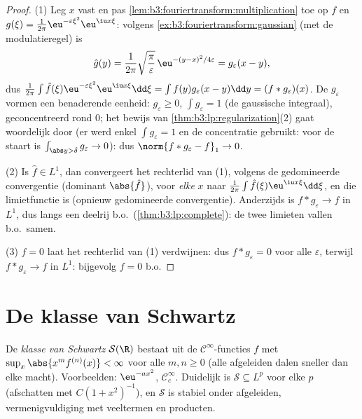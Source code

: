 \begin{proof}
(1) Leg $x$ vast en pas
\cref{lem:b3:fouriertransform:multiplication} toe op $f$ en
$g(\xi) = \frac1{2\pi}\eu^{-\varepsilon\xi^2}\eu^{\iu x\xi}$:
volgens \cref{ex:b3:fouriertransform:gaussian} (met de
modulatieregel) is
\[
\hat g(y) = \frac1{2\pi}\sqrt{\frac\pi\varepsilon}\,
\eu^{-(y - x)^2/4\varepsilon} = g_\varepsilon(x - y),
\]
dus $\frac1{2\pi}\int\hat f(\xi)\eu^{-\varepsilon\xi^2} \eu^{\iu
x\xi}\dd\xi = \int f(y)g_\varepsilon(x - y)\dd y =
(f*g_\varepsilon)(x)$. De $g_\varepsilon$ vormen een benaderende
eenheid: $g_\varepsilon \geq 0$, $\int g_\varepsilon = 1$ (de
gaussische integraal), geconcentreerd rond $0$; het bewijs van
\cref{thm:b3:lp:regularization}(2) gaat woordelijk door (er werd
enkel $\int g_\varepsilon = 1$ en de concentratie gebruikt: voor
de staart is $\int_{\abs y > \delta}g_\varepsilon \to 0$): dus
$\norm{f * g_\varepsilon - f}_1 \to 0$.

(2) Is $\hat f \in L^1$, dan convergeert het rechterlid van (1),
volgens de gedomineerde convergentie (dominant $\abs{\hat f}$),
voor \emph{elke} $x$ naar $\frac1{2\pi}\int\hat f(\xi)\eu^{\iu
x\xi}\dd\xi$, en die limietfunctie is  (opnieuw
gedomineerde convergentie). Anderzijds is $f * g_\varepsilon \to
f$ in $L^1$, dus langs een deelrij b.o.\
(\cref{thm:b3:lp:complete}): de twee limieten vallen b.o.\ samen.

(3) $\hat f = 0$ laat het rechterlid van (1) verdwijnen: dus $f *
g_\varepsilon = 0$ voor alle $\varepsilon$, terwijl $f *
g_\varepsilon \to f$ in $L^1$: bijgevolg $f = 0$ b.o.
\end{proof}

\section{De klasse van Schwartz}

\begin{definition}\label{def:b3:fouriertransform:schwartz}
De \emph{klasse van Schwartz}
$\mathcal S(\R)$ bestaat uit de $\mathcal C^\infty$-functies $f$
met $\sup_x\abs{x^m f^{(n)}(x)} < \infty$ voor alle $m, n \geq 0$
(alle afgeleiden dalen sneller dan elke macht). Voorbeelden:
$\eu^{-ax^2}$, $\mathcal C_c^\infty$. Duidelijk is $\mathcal S
\subseteq L^p$ voor elke $p$ (afschatten met $C(1 + x^2)^{-1}$),
en $\mathcal S$ is stabiel onder afgeleiden, vermenigvuldiging
met veeltermen en producten.
\end{definition}

